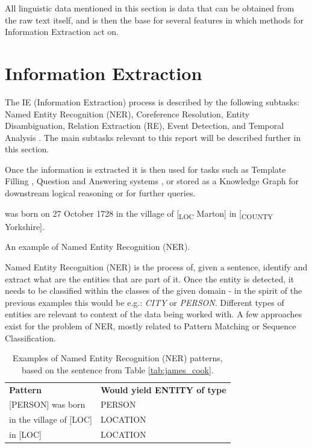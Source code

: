 \documentclass[11pt,a4paper,openright]{memoir}
\begin{document}
All linguistic data mentioned in this section is data that can be obtained from the raw text itself, and is then the base for several features in which methods for Information Extraction act on.


%
%
%
%


\section{Information Extraction}
\label{section:information_extraction}

The IE (Information Extraction) process is described by the following subtasks: Named Entity Recognition (NER), Coreference Resolution, Entity Disambiguation, Relation Extraction (RE), Event Detection, and Temporal Analysis \cite{Jurafsky:2000:SLP:555733}. The main subtasks relevant to this report will be described further in this section.

Once the information is extracted it is then used for tasks such as Template Filling \cite{Jurafsky:2000:SLP:555733}, Question and Answering systems \cite{Moens:2006:IEA:1177314}, or stored as a Knowledge Graph for downstream logical reasoning or for further queries.

\begin{table}[!htbp]
  \centering
   was born on 27 October 1728 in the village of [\textsubscript{LOC} Marton] in [\textsubscript{COUNTY} Yorkshire].
  \caption[An example of NER.]{An example of Named Entity Recognition (NER).}
  \label{tab:james_cook}
\end{table}

Named Entity Recognition (NER) is the process of, given a sentence, identify and extract what are the entities that are part of it. Once the entity is detected, it needs to be classified within the classes of the given domain - in the spirit of the previous examples this would be e.g.: \emph{CITY} or \emph{PERSON}. Different types of entities are relevant to context of the data being worked with. A few approaches exist for the problem of NER, mostly related to Pattern Matching or Sequence Classification.

\begin{table}[!htbp]
  \centering
    \begin{tabular}{ll}
      \textbf{Pattern}          & \textbf{Would yield ENTITY of type} \\
      {[PERSON]} was born       & PERSON            \\
      in the village of {[LOC]} & LOCATION          \\
      in {[LOC]}                & LOCATION           
    \end{tabular}
  \caption[Patterns for NER.]{Examples of Named Entity Recognition (NER) patterns, based on the sentence from Table \ref{tab:james_cook}.}
  \label{tab:james_cook_patterns}
\end{table}
\end{document}

